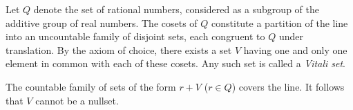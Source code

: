 Let $Q$ denote the set of rational numbers, considered as a subgroup of the additive group of real numbers. The cosets of $Q$ constitute a partition of the line into an uncountable family of disjoint sets, each congruent to $Q$ under translation. By the axiom of choice, there exists a set $V$ having one and only one element in common with each of these cosets. Any such set is called a \emph{Vitali set}.

The countable family of sets of the form $r + V$ ($r \in Q$) covers the line. It follows that $V$ cannot be a nullset.
